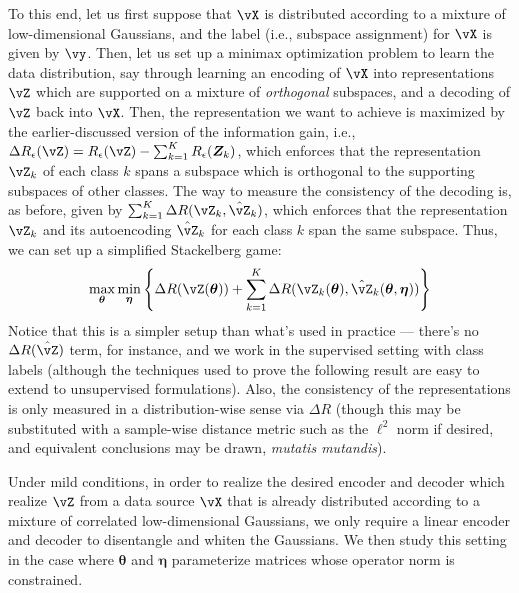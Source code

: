 \documentclass[\toplevelprefix/book-main.tex]{subfiles}
\begin{document}
To this end, let us first suppose that \(\vX\) is distributed according to a mixture of low-dimensional Gaussians, and the label (i.e., subspace assignment) for \(\vX\) is given by \(\vy\). Then, let us set up a minimax optimization problem to learn the data distribution, say through learning an encoding of \(\vX\) into representations \(\vZ\) which are supported on a mixture of \textit{orthogonal} subspaces, and a decoding of \(\vZ\) back into \(\vX\). Then, the representation we want to achieve is maximized by the earlier-discussed version of the information gain, i.e., \( \Delta R_{\epsilon}(\vZ) = R_{\epsilon}(\vZ) - \sum_{k=1}^K R_{\epsilon}(\bm Z_k) \), which enforces that the representation \(\vZ_{k}\) of each class \(k\) spans a subspace which is orthogonal to the supporting subspaces of other classes. The way to measure the consistency of the decoding is, as before, given by \(\sum_{k = 1}^{K}\Delta R(\vZ_{k}, \hat{\vZ}_{k})\), which enforces that the representation \(\vZ_{k}\) and its autoencoding \(\hat{\vZ}_{k}\) for each class \(k\) span the same subspace. Thus, we can set up a simplified Stackelberg game:
\begin{equation}\label{eq:ctrl_msp_game}
    \max_{\bm \theta}\min_{\bm \eta}\bc{\Delta R(\vZ(\bm \theta)) + \sum_{k = 1}^{K}\Delta R(\vZ_{k}(\bm \theta), \hat{\vZ}_{k}(\bm \theta, \bm \eta))}
\end{equation}
Notice that this is a simpler setup than what's used in practice --- there's no \(\Delta R(\hat{\vZ})\) term, for instance, and we work in the supervised setting with class labels (although the techniques used to prove the following result are easy to extend to unsupervised formulations). Also, the consistency of the representations is only measured in a distribution-wise sense via \(\Delta R\) (though this may be substituted with a sample-wise distance metric such as the \(\ell^{2}\) norm if desired, and equivalent conclusions may be drawn, \textit{mutatis mutandis}).

Under mild conditions, in order to realize the desired encoder and decoder which realize \(\vZ\) from a data source \(\vX\) that is already distributed according to a mixture of correlated low-dimensional Gaussians, we only require a linear encoder and decoder to disentangle and whiten the Gaussians. We then study this setting in the case where \(\bm \theta\) and \(\bm \eta\) parameterize matrices whose operator norm is constrained. 
\end{document}
